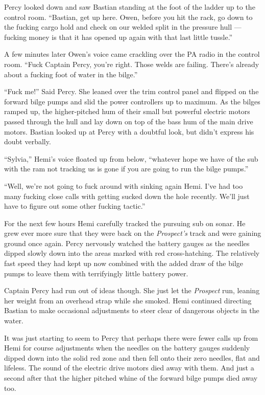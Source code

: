 \documentclass[
]{scrbook}
\begin{document}
Percy looked down and saw Bastian standing at the foot of the ladder up
to the control room. ``Bastian, get up here. Owen, before you hit the
rack, go down to the fucking cargo hold and check on our welded split in
the pressure hull --- fucking money is that it has opened up again with
that last little tussle.''

A few minutes later Owen's voice came crackling over the PA radio in the
control room. ``Fuck Captain Percy, you're right. Those welds are
failing. There's already about a fucking foot of water in the bilge.''

``Fuck me!'' Said Percy. She leaned over the trim control panel and
flipped on the forward bilge pumps and slid the power controllers up to
maximum. As the bilges ramped up, the higher-pitched hum of their small
but powerful electric motors passed through the hull and lay down on top
of the bass hum of the main drive motors. Bastian looked up at Percy
with a doubtful look, but didn't express his doubt verbally.

``Sylvia,'' Hemi's voice floated up from below, ``whatever hope we have
of the sub with the ram not tracking us is gone if you are going to run
the bilge pumps.''

``Well, we're not going to fuck around with sinking again Hemi. I've had
too many fucking close calls with getting sucked down the hole recently.
We'll just have to figure out some other fucking tactic.''

For the next few hours Hemi carefully tracked the pursuing sub on sonar.
He grew ever more sure that they were back on the \emph{Prospect's}
track and were gaining ground once again. Percy nervously watched the
battery gauges as the needles dipped slowly down into the areas marked
with red cross-hatching. The relatively fast speed they had kept up now
combined with the added draw of the bilge pumps to leave them with
terrifyingly little battery power.

Captain Percy had run out of ideas though. She just let the
\emph{Prospect} run, leaning her weight from an overhead strap while she
smoked. Hemi continued directing Bastian to make occasional adjustments
to steer clear of dangerous objects in the water.

It was just starting to seem to Percy that perhaps there were fewer
calls up from Hemi for course adjustments when the needles on the
battery gauges suddenly dipped down into the solid red zone and then
fell onto their zero needles, flat and lifeless. The sound of the
electric drive motors died away with them. And just a second after that
the higher pitched whine of the forward bilge pumps died away too.
\end{document}
